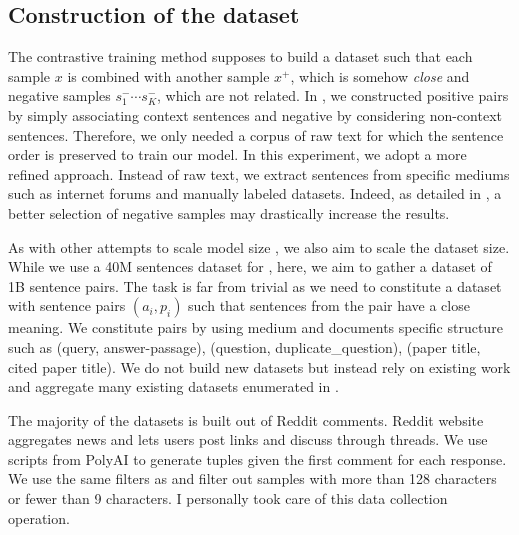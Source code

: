 \subsection{Construction of the dataset}

The contrastive training method supposes to build a dataset such that each sample $x$ is combined with another sample $x^+$, which is somehow \textit{close} and negative samples $s^-_1 \cdots s^-_K$, which are not related. In , we constructed positive pairs by simply associating context sentences and negative by considering non-context sentences. Therefore, we only needed a corpus of raw text for which the sentence order is preserved to train our model. In this experiment, we adopt a more refined approach. Instead of raw text, we extract sentences from specific mediums such as internet forums and manually labeled datasets. Indeed, as detailed in , a better selection of negative samples may drastically increase the results.

As with other attempts to scale model size \parencite{liu_2019, radford_2019, brown_20}, we also aim to scale the dataset size. While we use a 40M sentences dataset for \textcite{simoulin_2021a}, here, we aim to gather a dataset of 1B sentence pairs. The task is far from trivial as we need to constitute a dataset with sentence pairs $(a_i, p_i)$ such that sentences from the pair have a close meaning. We constitute pairs by using  medium and documents specific structure such as (query, answer-passage), (question, duplicate\_question), (paper title, cited paper title). We do not build new datasets but instead rely on existing work and aggregate many existing datasets enumerated in .

The majority of the datasets is built out of Reddit comments. Reddit website aggregates news and lets users post links and discuss through threads. We use scripts from PolyAI to generate tuples given the first comment for each response. We use the same filters as \textcite{henderson_2019} and filter out samples with more than 128 characters or fewer than 9 characters. I personally took care of this data collection operation.

